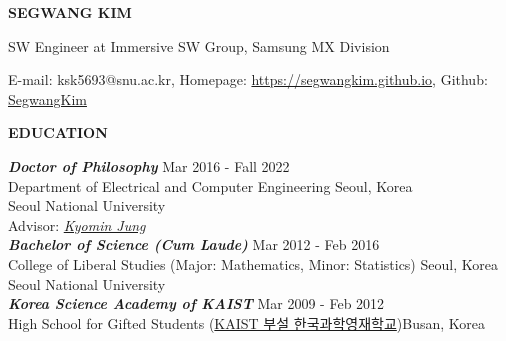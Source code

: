 \documentclass[12pt]{article}
\begin{document}

\begin{center}
	{\Large \bfseries SEGWANG KIM} \\ 
\end{center}

	\noindent SW Engineer at Immersive SW Group, Samsung MX Division\\
	\begin{small}
	E-mail: ksk5693@snu.ac.kr, Homepage: \url{https://segwangkim.github.io}, Github: \href{https://github.com/SegwangKim}{SegwangKim}
	\end{small}
\vspace{0.2in} %


\begin{center} %
	{\noindent \bfseries EDUCATION}
    \noindent\makebox[\linewidth]{\rule{0.75\paperwidth}{0.4pt}}
\end{center} %

\vspace{8pt} %

\noindent
{\sl \bfseries Doctor of Philosophy} \hfill Mar 2016 - Fall 2022\\ 
\noindent Department of Electrical and Computer Engineering \hfill Seoul, Korea\\ 
\noindent Seoul National University \\
\noindent Advisor: \href{http://milab.snu.ac.kr/kjung/}{\textit{Kyomin Jung}} \\ 

\noindent
{\sl \bfseries Bachelor of Science (Cum Laude)} \hfill Mar 2012 - Feb 2016 \\ 
\noindent College of Liberal Studies (Major: Mathematics, Minor: Statistics) \hfill Seoul, Korea\\
\noindent Seoul National University \\
	
\noindent
{\sl \bfseries Korea Science Academy of KAIST} \hfill Mar 2009 - Feb 2012 \\ 
\noindent High School for Gifted Students (\href{https://www.ksa.hs.kr/Eng}{KAIST 부설 한국과학영재학교})\hfill Busan, Korea\\
 
\vspace{0.2in} %
\end{document}
